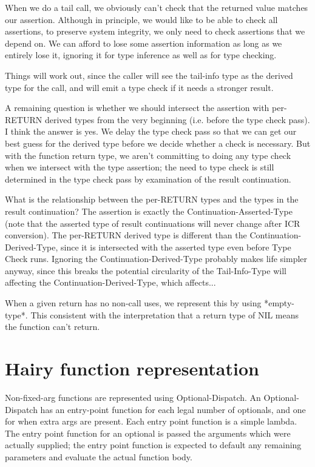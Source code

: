 When we do a tail call, we obviously can't check that the returned value
matches our assertion.  Although in principle, we would like to be able to
check all assertions, to preserve system integrity, we only need to check
assertions that we depend on.  We can afford to lose some assertion information
as long as we entirely lose it, ignoring it for type inference as well as for
type checking.

Things will work out, since the caller will see the tail-info type as the
derived type for the call, and will emit a type check if it needs a stronger
result.

A remaining question is whether we should intersect the assertion with
per-RETURN derived types from the very beginning (i.e. before the type check
pass).  I think the answer is yes.  We delay the type check pass so that we can
get our best guess for the derived type before we decide whether a check is
necessary.  But with the function return type, we aren't committing to doing
any type check when we intersect with the type assertion; the need to type
check is still determined in the type check pass by examination of the result
continuation.

What is the relationship between the per-RETURN types and the types in the
result continuation?  The assertion is exactly the Continuation-Asserted-Type
(note that the asserted type of result continuations will never change after
ICR conversion).  The per-RETURN derived type is different than the
Continuation-Derived-Type, since it is intersected with the asserted type even
before Type Check runs.  Ignoring the Continuation-Derived-Type probably makes
life simpler anyway, since this breaks the potential circularity of the
Tail-Info-Type will affecting the Continuation-Derived-Type, which affects...

When a given return has no non-call uses, we represent this by using
*empty-type*.  This consistent with the interpretation that a return type of
NIL means the function can't return.


\section{Hairy function representation}

Non-fixed-arg functions are represented using Optional-Dispatch.  An
Optional-Dispatch has an entry-point function for each legal number of
optionals, and one for when extra args are present.  Each entry point function
is a simple lambda.  The entry point function for an optional is passed the
arguments which were actually supplied; the entry point function is expected to
default any remaining parameters and evaluate the actual function body.

